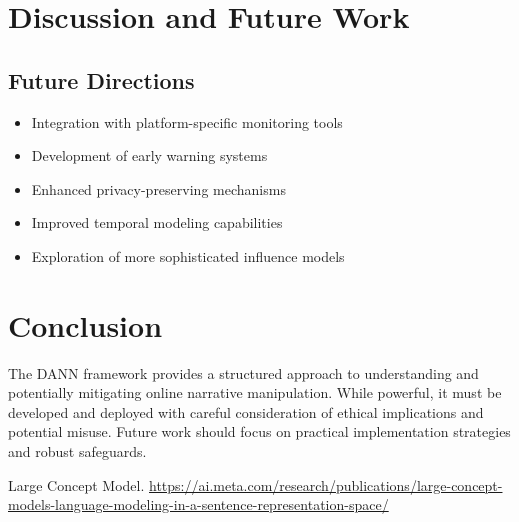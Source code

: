 \documentclass[12pt, a4paper]{article}
\begin{document}
\section{Discussion and Future Work}
\subsection{Future Directions}
\begin{itemize}
    \item Integration with platform-specific monitoring tools
    \item Development of early warning systems
    \item Enhanced privacy-preserving mechanisms
    \item Improved temporal modeling capabilities
    \item Exploration of more sophisticated influence models
\end{itemize}

\section{Conclusion}
The DANN framework provides a structured approach to understanding and potentially mitigating online narrative manipulation. While powerful, it must be developed and deployed with careful consideration of ethical implications and potential misuse. Future work should focus on practical implementation strategies and robust safeguards.

\begin{thebibliography}{9}
    Large Concept Model. 
    \href{https://ai.meta.com/research/publications/large-concept-models-language-modeling-in-a-sentence-representation-space/}{https://ai.meta.com/research/publications/large-concept-models-language-modeling-in-a-sentence-representation-space/}

\end{thebibliography}
\end{document}

